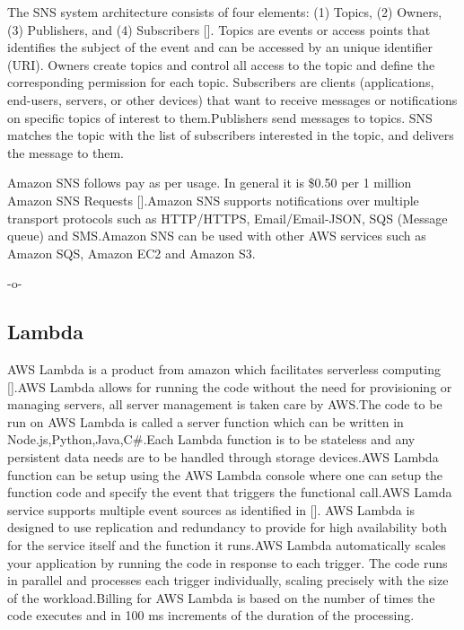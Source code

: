 The SNS system architecture consists of four elements: (1) Topics, (2)
Owners, (3) Publishers, and (4)
Subscribers [\cite{www-sns-blog}]. Topics are events or access points
that identifies the subject of the event and can be accessed by an
unique identifier (URI). Owners create topics and control all access
to the topic and define the corresponding permission for each
topic. Subscribers are clients (applications, end-users, servers, or
other devices) that want to receive messages or notifications on
specific topics of interest to them.Publishers send messages to
topics. SNS matches the topic with the list of subscribers interested
in the topic, and delivers the message to them.

Amazon SNS follows pay as per usage. In general it is \$0.50 per 1
million Amazon SNS Requests [\cite{www-sns-faq}].Amazon SNS supports
notifications over multiple transport protocols such as HTTP/HTTPS,
Email/Email-JSON, SQS (Message queue) and SMS.Amazon SNS can be used
with other AWS services such as Amazon SQS, Amazon EC2 and Amazon S3.

     -o-

\subsection{Lambda}

AWS Lambda is a product from amazon which facilitates serverless
computing [\cite{www-awslambda}].AWS Lambda allows for running the code
without the need for provisioning or managing servers, all server
management is taken care by AWS.The code to be run on AWS Lambda is
called a server function which can be written in
Node.js,Python,Java,C\#.Each Lambda function is to be stateless and
any persistent data needs are to be handled through storage
devices.AWS Lambda function can be setup using the AWS Lambda console
where one can setup the function code and specify the event that
triggers the functional call.AWS Lamda service supports multiple event
sources as identified in [\cite{www-awslambdaevent}]. AWS Lambda is
designed to use replication and redundancy to provide for high
availability both for the service itself and the function it runs.AWS
Lambda automatically scales your application by running the code in
response to each trigger. The code runs in parallel and processes each
trigger individually, scaling precisely with the size of the
workload.Billing for AWS Lambda is based on the number of times the
code executes and in 100 ms increments of the duration of the
processing.

